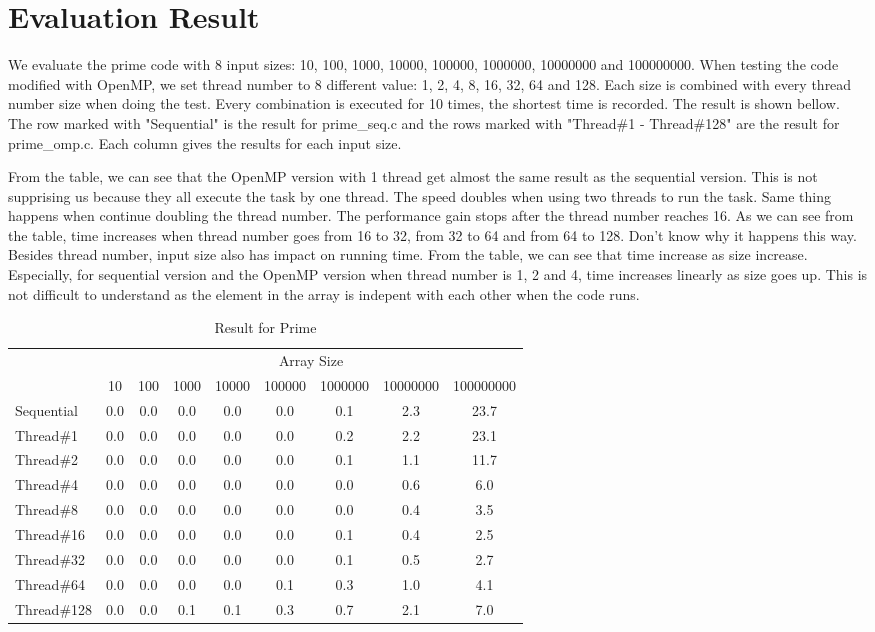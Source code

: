 \documentclass[11pt,letterpaper,oneside]{article}
\begin{document}
\section{Evaluation Result}
We evaluate the prime code with 8 input sizes: 10, 100, 1000, 10000, 100000, 1000000, 10000000 and 100000000. When testing the code modified with OpenMP, we set thread number to 8 different value: 1, 2, 4, 8, 16, 32, 64 and 128. Each size is combined with every thread number size when doing the test. Every combination is executed for 10 times, the shortest time is recorded. The result is shown bellow. The row marked with "Sequential" is the result for prime\_seq.c and the rows marked with "Thread\#1 - Thread\#128" are the result for prime\_omp.c. Each column gives the results for each input size.

From the table, we can see that the OpenMP version with 1 thread get almost the same result as the sequential version. This is not supprising us because they all execute the task by one thread. The speed doubles when using two threads to run the task. Same thing happens when continue doubling the thread number. The performance gain stops after the thread number reaches 16. As we can see from the table, time increases when thread number goes from 16 to 32, from 32 to 64 and from 64  to 128. Don't know why it happens this way. Besides thread number, input size also has impact on running time. From the table, we can see that time increase as size increase. Especially, for sequential version and the OpenMP version when thread number is 1, 2 and 4, time increases linearly as size goes up. This is not difficult to understand as the element in the array is indepent with each other when the code runs.

% 
\begin{table}[th]
\caption{Result for Prime}
\centering
\begin{tabular}{l||c|c|c|c|c|c|c|c}
\hline
 & \multicolumn{8}{c}{Array Size}\\
\cline{2-9}
 & 10 & 100 & 1000 & 10000 & 100000 & 1000000 & 10000000 & 100000000\\
\hline\hline
Sequential & 0.0 & 0.0 & 0.0 & 0.0 & 0.0 & 0.1 & 2.3 & 23.7 \\
\hline
Thread\#1  & 0.0 & 0.0 & 0.0 & 0.0 & 0.0 & 0.2 & 2.2 & 23.1 \\
Thread\#2  & 0.0 & 0.0 & 0.0 & 0.0 & 0.0 & 0.1 & 1.1 & 11.7 \\
Thread\#4  & 0.0 & 0.0 & 0.0 & 0.0 & 0.0 & 0.0 & 0.6 & 6.0 \\
Thread\#8  & 0.0 & 0.0 & 0.0 & 0.0 & 0.0 & 0.0 & 0.4 & 3.5 \\
Thread\#16 & 0.0 & 0.0 & 0.0 & 0.0 & 0.0 & 0.1 & 0.4 & 2.5 \\
Thread\#32 & 0.0 & 0.0 & 0.0 & 0.0 & 0.0 & 0.1 & 0.5 & 2.7 \\
Thread\#64 & 0.0 & 0.0 & 0.0 & 0.0 & 0.1 & 0.3 & 1.0 & 4.1 \\
Thread\#128 & 0.0 & 0.0 & 0.1 & 0.1 & 0.3 & 0.7 & 2.1 & 7.0 \\
\hline
\end{tabular}
\label{table:prime}
\end{table}
\end{document}
